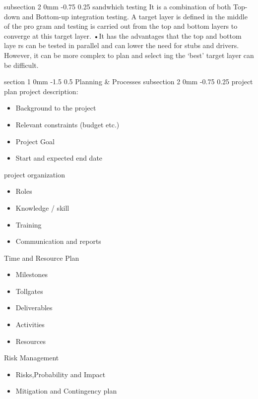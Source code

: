 \documentclass[a4paper,11pt]{article}
\makeatletter
\renewcommand{\section}{\@startsection
   {section}%
   {1}%
   {0mm}%
   {-1.5\baselineskip}%
   {0.5\baselineskip}%
   {\sffamily\bfseries\upshape\normalsize}}%
\renewcommand{\subsection}{\@startsection
   {subsection}%
   {2}%
   {0mm}%
   {-0.75\baselineskip}%
   {0.25\baselineskip}%
   {\rmfamily\normalfont\slshape\normalsize}}%
\makeatother
\begin{document}
\subsection{sandwhich testing}
It is a combination of both Top-down and Bottom-up
integration testing. A target layer is defined in the middle of the pro
gram and testing is carried out
from the top and bottom layers to converge at this
target layer.
•It has the advantages that the top and bottom laye
rs can be tested in parallel and
can lower the need for stubs and drivers. However, it can be more complex to plan and select
ing the ‘best’ target layer can
be difficult. 

\section{Planning \& Processes}
\subsection{project plan}
project description:
\begin{itemize}
\item Background to the project
\item Relevant constraints (budget etc.)
\item Project Goal
\item Start and expected end date
\end{itemize}
project organization
\begin{itemize}
\item Roles
\item Knowledge / skill
\item Training
\item Communication and reports
\end{itemize}
Time and Resource Plan
\begin{itemize}
\item Milestones
\item Tollgates
\item Deliverables
\item Activities
\item Resources
\end{itemize}
Risk Management
\begin{itemize}
\item Risks,Probability and Impact
\item Mitigation and Contingency plan
\end{itemize}
\end{document}
